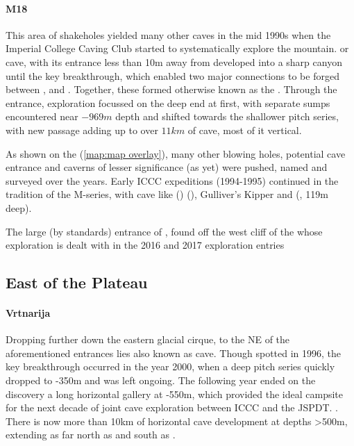 \paragraph{M18} This area of shakeholes yielded many other caves in the mid 1990s when the Imperial College Caving Club started to systematically explore the mountain.  or  cave, with its entrance less than 10m away from  developed into a sharp canyon until the key  breakthrough, which enabled two major connections to be forged between ,  and . Together, these formed  otherwise known as the . Through the  entrance, exploration focussed on the deep end at first, with separate sumps encountered near $-969m$ depth and shifted towards the shallower pitch series, with new passage adding up to over $11km$ of cave, most of it vertical.

As shown on the  (\vref{map:map overlay}), many other blowing holes, potential cave entrance and caverns of lesser significance (as yet) were pushed, named and surveyed over the years. Early ICCC expeditions (1994-1995) continued in the tradition of the M-series, with cave like  ()  (), Gulliver's Kipper and  (, 119m deep). 

\begin{marginfigure}
\checkoddpage \ifoddpage \forcerectofloat \else \forceversofloat \fi
\centering
 \caption{The large (by \protect{} standards) entrance of \protect{}, found off the west cliff of the \protect{} whose exploration is dealt with in the 2016 and 2017 exploration entries }
 \label{surfaceprima}
\end{marginfigure}

\subsection{East of the Plateau} 

\paragraph{Vrtnarija}
Dropping further down the eastern glacial cirque, to the NE of the aforementioned entrances lies  also known as   cave. Though spotted in 1996, the key breakthrough occurred in the year 2000, when a deep pitch series quickly dropped to -350m and was left ongoing. The following year ended on the discovery a long horizontal gallery at -550m, which provided the ideal campsite for the next decade of joint cave exploration between ICCC and the JSPDT. . There is now more than 10km of horizontal cave development at depths >500m, extending as far north as  and south as . 

